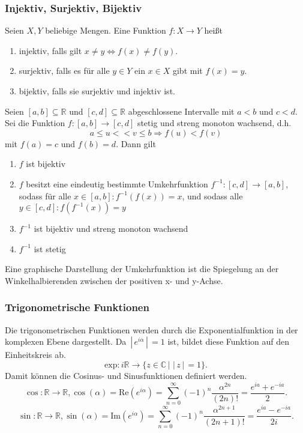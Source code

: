 \documentclass[a4paper,12pt]{article}
\numberwithin{equation}{section}
\begin{document}
\subsubsection{Injektiv, Surjektiv, Bijektiv}
Seien $X,Y$ beliebige Mengen. Eine Funktion $f:X\rightarrow Y$ heißt
\begin{enumerate}[label=(\alph*)]
        \item injektiv, falls gilt $x\neq y\Leftrightarrow f\left(x\right)\neq f\left(y\right)$. 
        \item surjektiv, falls es für alle $y \in Y$ ein $x \in X$ gibt mit $f\left(x\right)=y$.
        \item bijektiv, falls sie surjektiv und injektiv ist.
\end{enumerate}
Seien $[a,b]\subseteq \mathbb{R}$ und $[c,d]\subseteq \mathbb{R}$ abgeschlossene Intervalle mit $a<b$ und $c<d$. Sei die Funktion $f:[a,b]\rightarrow [c,d]$ stetig und streng monoton wachsend, d.h.
\[ 
        a\leq u<<v\leq b\Rightarrow f\left(u\right)<f\left(v\right)
\] 
mit $f\left(a\right)=c$ und $f\left(b\right)=d$. Dann gilt
\begin{enumerate}[label=(\alph*)]
        \item $f$ ist bijektiv
        \item $f$ besitzt eine eindeutig bestimmte Umkehrfunktion $f^{-1}:[c,d]\rightarrow [a,b]$, sodass für alle $x \in [a,b]:f^{-1}\left(f\left(x\right)\right)=x$, und sodass alle $y \in [c,d]:f\left(f^{-1}\left(x\right)\right)=y$
        \item $f^{-1}$ ist bijektiv und streng monoton wachsend
        \item $f^{-1}$ ist stetig
\end{enumerate}
Eine graphische Darstellung der Umkehrfunktion ist die Spiegelung an der Winkelhalbierenden zwischen der positiven x- und y-Achse.

\subsubsection{Trigonometrische Funktionen}
Die trigonometrischen Funktionen werden durch die Exponentialfunktion in der komplexen Ebene dargestellt. Da $\,|\, e^{i\alpha }\,|\, =1$ ist, bildet diese Funktion auf den Einheitskreis ab.
\[ 
        \text{exp}:i\mathbb{R}\rightarrow \{z \in \mathbb{C}\,|\, \,|\, z\,|\, =1\}
.\] 
Damit können die Cosinus- und Sinusfunktionen definiert werden.
\[ 
        \cos :\mathbb{R}\rightarrow \mathbb{R},\cos \left(\alpha \right)=\text{Re}\left(e^{i\alpha }\right)=\sum_{n=0}^{\infty}\left(-1\right)^{n}\dfrac{\alpha ^{2n}}{\left(2n\right)!}=\dfrac{e^{ia}+e^{-ia}}{2}
.\] 
\[ 
        \sin :\mathbb{R}\rightarrow \mathbb{R},\sin \left(\alpha \right)=\text{Im}\left(e^{i\alpha }\right)=\sum_{n=0}^{\infty}\left(-1\right)^{n}\dfrac{\alpha ^{2n+1}}{\left(2n+1\right)!}=\dfrac{e^{ia}-e^{-ia}}{2i}
.\] 
\end{document}
